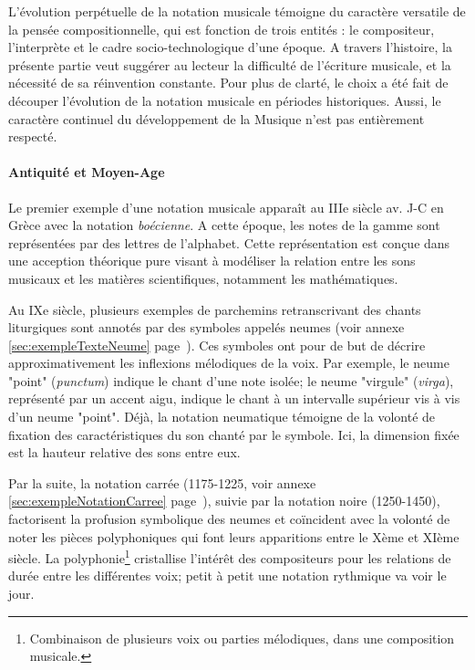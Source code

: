 L'évolution perpétuelle de la notation musicale témoigne du caractère versatile de la pensée compositionnelle, qui est fonction de trois entités : le compositeur, l'interprète et le cadre socio-technologique d'une époque\cite{bosseur2005}.
A travers l'histoire, la présente partie veut suggérer au lecteur la difficulté de l'écriture musicale, et la nécessité de sa réinvention constante.
Pour plus de clarté, le choix a été fait de découper l'évolution de la notation musicale en périodes historiques. Aussi, le caractère continuel du développement de la Musique n'est pas entièrement respecté.   

\paragraph{Antiquité et Moyen-Age} Le premier exemple d'une notation musicale apparaît au IIIe siècle av. J-C en Grèce avec la notation \textit{boécienne}. A cette époque, les notes de la gamme sont représentées par des lettres de l'alphabet.
Cette représentation est conçue dans une acception théorique pure visant à modéliser la relation entre les sons musicaux et les matières scientifiques, notamment les mathématiques.

Au IXe siècle, plusieurs exemples de parchemins retranscrivant des chants liturgiques sont annotés par des symboles appelés \glspl{neume} (voir annexe \ref{sec:exempleTexteNeume} page~\pageref{sec:exempleTexteNeume}). 
Ces symboles ont pour de but de décrire approximativement les inflexions mélodiques de la voix. Par exemple, le neume "point" (\textit{punctum}) indique le chant d'une note isolée; le neume "virgule" (\textit{virga}), représenté par un accent aigu, indique le chant à un intervalle supérieur vis à vis d'un neume "point".
Déjà, la notation neumatique témoigne de la volonté de fixation des caractéristiques du son chanté par le symbole. Ici, la dimension fixée est la hauteur relative des sons entre eux.

Par la suite, la notation carrée (1175-1225, voir annexe \ref{sec:exempleNotationCarree} page~\pageref{sec:exempleNotationCarree}), suivie par la notation noire (1250-1450), factorisent la profusion symbolique des neumes et coïncident avec la volonté de noter les pièces polyphoniques qui font leurs apparitions entre le Xème et XIème siècle.
La \gls{polyphonie}\footnote{Combinaison de plusieurs voix ou parties mélodiques, dans une composition musicale.} cristallise l'intérêt des compositeurs pour les relations de durée entre les différentes voix; petit à petit une notation rythmique va voir le jour.

